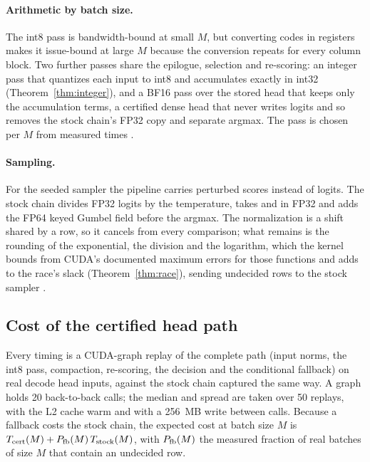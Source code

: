 \paragraph{Arithmetic by batch size.} The int8 pass is bandwidth-bound at small $M$, but converting codes in registers makes it issue-bound at large $M$ because the conversion repeats for every column block. Two further passes share the epilogue, selection and re-scoring: an integer pass that quantizes each input to int8 and accumulates exactly in int32 (Theorem~\ref{thm:integer}), and a BF16 pass over the stored head that keeps only the accumulation terms, a certified dense head that never writes logits and so removes the stock chain's FP32 copy and separate argmax. The pass is chosen per $M$ from measured times .

\paragraph{Sampling.} For the seeded sampler the pipeline carries perturbed scores instead of logits. The stock chain divides FP32 logits by the temperature, takes  and  in FP32 and adds the FP64 keyed Gumbel field before the argmax. The normalization is a shift shared by a row, so it cancels from every comparison; what remains is the rounding of the exponential, the division and the logarithm, which the kernel bounds from CUDA's documented maximum errors for those functions and adds to the race's slack (Theorem~\ref{thm:race}), sending undecided rows to the stock sampler .

\subsection{Cost of the certified head path}\label{sec:kernel-runtime}
Every timing is a CUDA-graph replay of the complete path (input norms, the int8 pass, compaction, re-scoring, the decision and the conditional fallback) on real decode head inputs, against the stock chain captured the same way. A graph holds 20 back-to-back calls; the median and spread are taken over 50 replays, with the L2 cache warm and with a 256~MB write between calls. Because a fallback costs the stock chain, the expected cost at batch size $M$ is $T_{\rm cert}(M)+P_{\rm fb}(M)\,T_{\rm stock}(M)$, with $P_{\rm fb}(M)$ the measured fraction of real batches of size $M$ that contain an undecided row.

